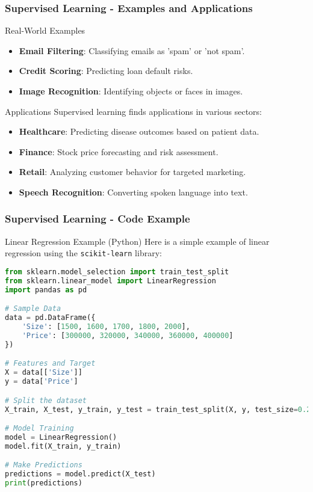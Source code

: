 \documentclass[aspectratio=169]{beamer}
\begin{document}
\begin{frame}[fragile]
    \frametitle{Supervised Learning - Examples and Applications}
    \begin{block}{Real-World Examples}
        \begin{itemize}
            \item \textbf{Email Filtering}: Classifying emails as 'spam' or 'not spam'.
            \item \textbf{Credit Scoring}: Predicting loan default risks.
            \item \textbf{Image Recognition}: Identifying objects or faces in images.
        \end{itemize}
    \end{block}
    
    \begin{block}{Applications}
        Supervised learning finds applications in various sectors:
        \begin{itemize}
            \item \textbf{Healthcare}: Predicting disease outcomes based on patient data.
            \item \textbf{Finance}: Stock price forecasting and risk assessment.
            \item \textbf{Retail}: Analyzing customer behavior for targeted marketing.
            \item \textbf{Speech Recognition}: Converting spoken language into text.
        \end{itemize}
    \end{block}
\end{frame}

\begin{frame}[fragile]
    \frametitle{Supervised Learning - Code Example}
    \begin{block}{Linear Regression Example (Python)}
    Here is a simple example of linear regression using the \texttt{scikit-learn} library:
    \begin{lstlisting}[language=Python]
from sklearn.model_selection import train_test_split
from sklearn.linear_model import LinearRegression
import pandas as pd

# Sample Data
data = pd.DataFrame({
    'Size': [1500, 1600, 1700, 1800, 2000],
    'Price': [300000, 320000, 340000, 360000, 400000]
})

# Features and Target
X = data[['Size']]
y = data['Price']

# Split the dataset
X_train, X_test, y_train, y_test = train_test_split(X, y, test_size=0.2)

# Model Training
model = LinearRegression()
model.fit(X_train, y_train)

# Make Predictions
predictions = model.predict(X_test)
print(predictions)
    \end{lstlisting}
    \end{block}
\end{frame}
\end{document}
